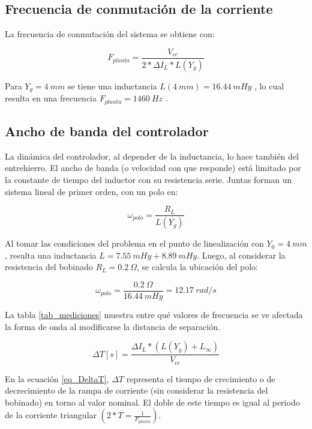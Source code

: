 \subsection{Frecuencia de conmutación de la corriente}

\noindent La frecuencia de conmutación del sistema se obtiene con:

\begin{equation}\label{eq_frec-sw} 
F_{planta} = \frac{V_{cc}}{2*\Delta I_L * L(Y_g)}
\end{equation}

\noindent Para $Y_g = 4 \:mm $ se tiene una inductancia $L(4\:mm) = 16.44 \:mHy$ , lo cual resulta en una frecuencia $F_{planta}= 1460\:Hz$ .

\subsection{Ancho de banda del controlador}\label{esccion_AB_Controlador} 

\noindent La dinámica del controlador, al depender de la inductancia, lo hace también del entrehierro. El ancho de banda (o velocidad con que responde) está limitado por la constante de tiempo del inductor con su resistencia serie. Juntas forman un sistema lineal de primer orden, con un polo en: 

\begin{equation} \label{eq_frec-angular}
\omega _{polo} = \frac{R_L}{L(Y_g)}
\end{equation}

\noindent Al tomar las condiciones del problema en el punto de linealización con $Y_{0}=4\:mm$, resulta una inductancia $L = 7.55 \:mHy + 8.89 \:mHy$. Luego, al considerar la resistencia del bobinado $R_L=0.2\:\Omega$, se calcula la ubicación del polo:

\begin{equation} 
\omega _{polo} = \frac{0.2\:\Omega}{16.44 \:mHy} = 12.17 \:rad/s
\end{equation}

\noindent La tabla \ref{tab_mediciones} muestra  entre qué valores de frecuencia se ve afectada la forma de onda al modificarse la distancia de separación.

\begin{equation} \label{eq_DeltaT}
\Delta T [s] = \frac{\Delta I_L * (L(Y_g) + L_{\infty})}{V_{cc}}
\end{equation}

\noindent En la ecuación \ref{eq_DeltaT}, $\Delta T$ representa el tiempo de crecimiento o de decrecimiento de la rampa de corriente (sin considerar la resistencia del bobinado) en torno al valor nominal. El doble de este tiempo es igual al periodo de la corriente triangular $(2*T=\frac{1}{F_{planta}})$.

